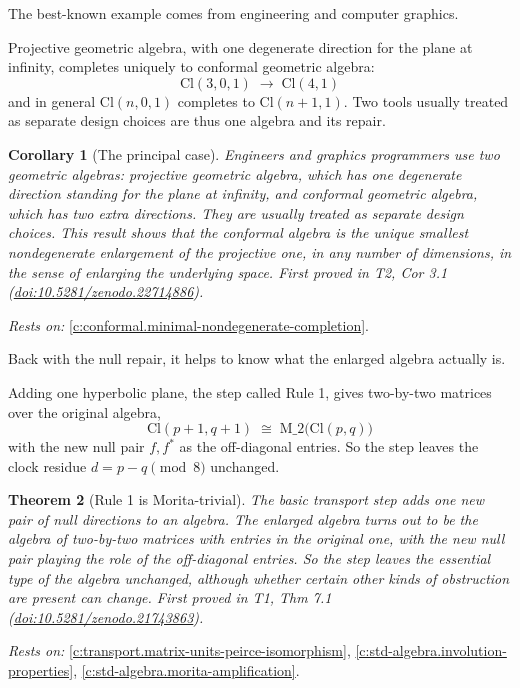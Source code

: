 \documentclass[11pt]{article}
\newtheorem{theorem}{Theorem}[section]
\newtheorem{corollary}[theorem]{Corollary}
\theoremstyle{definition}
\theoremstyle{plain}
\providecommand{\Cl}{}\renewcommand{\Cl}{\mathrm{Cl}}
\providecommand{\Mat}{}\renewcommand{\Mat}{\mathrm{M}}
\begin{document}
The best-known example comes from engineering and computer graphics.

Projective geometric algebra, with one degenerate direction for the plane at infinity, completes uniquely to conformal geometric algebra: \[ \Cl(3,0,1) \;\longrightarrow\; \Cl(4,1) \] and in general $\Cl(n,0,1)$ completes to $\Cl(n{+}1,1)$. Two tools usually treated as separate design choices are thus one algebra and its repair.

\begin{corollary}[The principal case]\label{c:conformal.principal-case}
Engineers and graphics programmers use two geometric algebras: projective geometric algebra, which has one degenerate direction standing for the plane at infinity, and conformal geometric algebra, which has two extra directions. They are usually treated as separate design choices. This result shows that the conformal algebra is the unique smallest nondegenerate enlargement of the projective one, in any number of dimensions, in the sense of enlarging the underlying space.
\emph{First proved in} T2, Cor 3.1 (\href{https://doi.org/10.5281/zenodo.22714886}{doi:10.5281/zenodo.22714886}).
\end{corollary}
\noindent\emph{Rests on:} \ref{c:conformal.minimal-nondegenerate-completion}.

Back with the null repair, it helps to know what the enlarged algebra actually is.

Adding one hyperbolic plane, the step called Rule 1, gives two-by-two matrices over the original algebra, \[ \Cl(p{+}1, q{+}1) \;\cong\; \Mat\_2\bigl(\Cl(p,q)\bigr) \] with the new null pair $f, f^*$ as the off-diagonal entries. So the step leaves the clock residue $d = p - q \pmod 8$ unchanged.

\begin{theorem}[Rule 1 is Morita-trivial]\label{c:transport.rule-1-morita-trivial}
The basic transport step adds one new pair of null directions to an algebra. The enlarged algebra turns out to be the algebra of two-by-two matrices with entries in the original one, with the new null pair playing the role of the off-diagonal entries. So the step leaves the essential type of the algebra unchanged, although whether certain other kinds of obstruction are present can change.
\emph{First proved in} T1, Thm 7.1 (\href{https://doi.org/10.5281/zenodo.21743863}{doi:10.5281/zenodo.21743863}).
\end{theorem}
\noindent\emph{Rests on:} \ref{c:transport.matrix-units-peirce-isomorphism}, \ref{c:std-algebra.involution-properties}, \ref{c:std-algebra.morita-amplification}.
\end{document}
